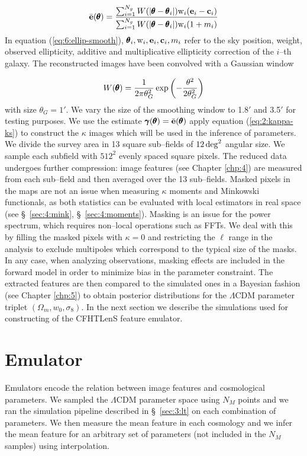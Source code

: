 \begin{equation}
\label{eq:6:ellip-smooth}
\bar{\mathbf{e}}(\pmb{\theta}) = \frac{\sum_{i=1}^{N_g}W(\vert\pmb{\theta}-\pmb{\theta}_i\vert){\rm w}_i(\mathbf{e}_i -\mathbf{c}_i)}{\sum_{i=1}^{N_g}W(\vert\pmb{\theta}-\pmb{\theta}_i\vert){\rm w}_i(1+m_i)}
\end{equation}
%
In equation (\ref{eq:6:ellip-smooth}), $\pmb{\theta}_i,{\rm w}_i,\mathbf{e}_i,\mathbf{c}_i,m_i$ refer to the sky position, weight, observed ellipticity, additive and multiplicative ellipticity correction of the $i$--th galaxy. The reconstructed images have been convolved with a Gaussian window 

\begin{equation}
\label{eq:6:gausswin}
W(\pmb{\theta}) = \frac{1}{2\pi\theta_G^2}\exp\left(-\frac{\theta^2}{2\theta_G^2}\right)
\end{equation}
%
with size $\theta_G=1'$. We vary the size of the smoothing window to 1.8$'$ and 3.5$'$ for testing purposes. We use the estimate $\pmb{\gamma}(\pmb{\theta})=\bar{\mathbf{e}}(\pmb{\theta})$ apply equation (\ref{eq:2:kappa-ks}) to construct the $\kappa$ images which will be used in the inference of parameters. We divide the survey area in 13 square sub--fields of $12\,{\rm deg}^2$ angular size. We sample each subfield with $512^2$ evenly spaced square pixels. The reduced data undergoes further compression: image features (see Chapter \ref{chp:4}) are measured from each sub--field and then averaged over the 13 sub--fields. Masked pixels in the maps are not an issue when measuring $\kappa$ moments and Minkowski functionals, as both statistics can be evaluated with local estimators in real space (see \S~\ref{sec:4:mink}, \S~\ref{sec:4:moments}). Masking is an issue for the power spectrum, which requires non--local operations such as FFTs. We deal with this by filling the masked pixels with $\kappa=0$ and restricting the $\ell$ range in the analysis to exclude multipoles which correspond to the typical size of the masks. In any case, when analyzing observations, masking effects are included in the forward model in order to minimize bias in the parameter constraint. The extracted features are then compared to the simulated ones in a Bayesian fashion (see Chapter \ref{chp:5}) to obtain posterior distributions for the $\Lambda$CDM parameter triplet $(\Omega_m,w_0,\sigma_8)$. In the next section we describe the simulations used for constructing of the CFHTLenS feature emulator.      

\section{Emulator}
Emulators encode the relation between image features and cosmological parameters. We sampled the $\Lambda$CDM parameter space using $N_M$ points and we ran the simulation pipeline described in \S~\ref{sec:3:lt} on each combination of parameters. We then measure the mean feature in each cosmology and we infer the mean feature for an arbitrary set of parameters (not included in the $N_M$ samples) using interpolation. 

